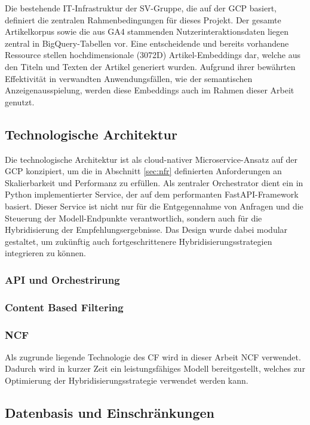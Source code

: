Die bestehende IT-Infrastruktur der SV-Gruppe, die auf der \ac{GCP} basiert, definiert die zentralen Rahmenbedingungen für dieses Projekt. 
Der gesamte Artikelkorpus sowie die aus \ac{GA4} stammenden Nutzerinteraktionsdaten liegen zentral in BigQuery-Tabellen vor. 
Eine entscheidende und bereits vorhandene Ressource stellen hochdimensionale (3072D) Artikel-Embeddings dar, 
welche aus den Titeln und Texten der Artikel generiert wurden. Aufgrund ihrer bewährten Effektivität in verwandten Anwendungsfällen, 
wie der semantischen Anzeigenausspielung, werden diese Embeddings auch im Rahmen dieser Arbeit genutzt.

\subsection{Technologische Architektur}

Die technologische Architektur ist als cloud-nativer Microservice-Ansatz auf der \ac{GCP} konzipiert,
um die in Abschnitt \ref{sec:nfr} definierten Anforderungen an Skalierbarkeit und Performanz zu erfüllen. 
Als zentraler Orchestrator dient ein in Python implementierter Service, der auf dem performanten FastAPI-Framework basiert. 
Dieser Service ist nicht nur für die Entgegennahme von Anfragen und die Steuerung der Modell-Endpunkte verantwortlich, 
sondern auch für die Hybridisierung der Empfehlungsergebnisse. Das Design wurde dabei modular gestaltet, 
um zukünftig auch fortgeschrittenere Hybridisierungsstrategien integrieren zu können.
\subsubsection{API und Orchestrirung}
\subsubsection{Content Based Filtering}
\subsubsection{NCF}
Als zugrunde liegende Technologie des \ac{CF} wird in dieser Arbeit \ac{NCF} verwendet. Dadurch wird in kurzer Zeit 
ein leistungsfähiges Modell bereitgestellt, welches zur Optimierung der Hybridisierungsstrategie verwendet werden kann.



\subsection{Datenbasis und Einschränkungen}
